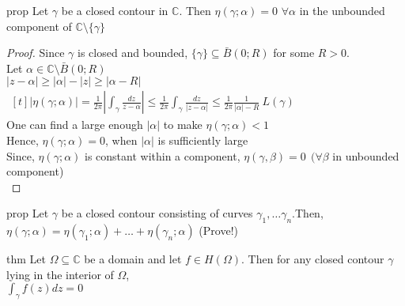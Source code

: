 \begin{restatable}[]{prop}{}\label{}
Let $\gamma$ be a closed contour in $\mathds{C}$. Then $\eta(\gamma;\alpha)=0$ $\forall \alpha$ in the unbounded component of $\mathds{C}\setminus \{\gamma\}$
\end{restatable}
\begin{proof}
Since $\gamma$ is closed and bounded, $\{\gamma\}\subseteq \bar{B}(0;R)$ for some $R>0$.\\
Let $\alpha \in\mathds{C}\setminus \bar{B}(0;R)$ \\
$|z-\alpha|\geq |\alpha|-|z|\geq |\alpha-R|$\\
$\begin{aligned}[t] |\eta(\gamma;\alpha)|=\frac{1}{2\pi}|\int_{\gamma}^{}\frac{dz}{z-\alpha}| \leq \frac{1}{2\pi} \int_{\gamma}^{}\frac{dz}{|z-\alpha|}\leq \frac{1}{2\pi} \frac{1}{|\alpha|-R}\:L(\gamma)\end{aligned}$\\
One can find a large enough $|\alpha|$ to make $\eta(\gamma;\alpha)<1$\\
Hence, $\eta(\gamma;\alpha)=0$, when $|\alpha|$ is sufficiently large \\
Since, $\eta(\gamma;\alpha)$ is constant within a component, $\eta(\gamma,\beta)=0 \:\:(\forall \beta$ in unbounded component)\\
\end{proof}
\begin{restatable}[]{prop}{}\label{}
Let $\gamma$ be a closed contour consisting of curves $\gamma_1,\dots \gamma_n$.Then,\\
$\eta(\gamma;\alpha)=\eta(\gamma_1;\alpha)+\dots +\eta(\gamma_n;\alpha)$ (Prove!)
\end{restatable}
\begin{restatable}{thm}{}\label{}
Let $\Omega\subseteq \mathds{C}$ be a domain and let $f\in H(\Omega)$. Then for any closed contour $\gamma$ lying in the interior of $\Omega$,\\
$\int_{\gamma}^{} f(z) dz=0$
\end{restatable}
